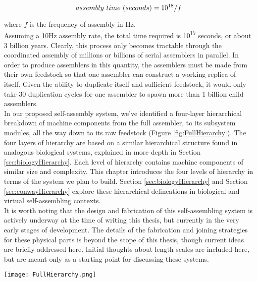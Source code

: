 {\[assembly\ time\ (seconds) = 10\textsuperscript{18}/f\]

where $f$ is the frequency of assembly in Hz.\\

Assuming a 10Hz assembly rate, the total time required is 10\textsuperscript{17} seconds, or about 3 billion years.  Clearly, this process only becomes tractable through the coordinated assembly of millions or billions of serial assemblers in parallel.  In order to produce assemblers in this quantity, the assemblers must be made from their own feedstock so that one assembler can construct a working replica of itself.  Given the ability to duplicate itself and sufficient feedstock, it would only take 30 duplication cycles for one assembler to spawn more than 1 billion child assemblers.\\

In our proposed self-assembly system, we've identified a four-layer hierarchical breakdown of machine components from the full assembler, to its subsystem modules, all the way down to its raw feedstock (Figure \ref{fig:FullHierarchy}).  The four layers of hierarchy are based on a similar hierarchical structure found in analogous biological systems, explained in more depth in Section \ref{sec:biologyHierarchy}.  Each level of hierarchy contains machine components of similar size and complexity.  This chapter introduces the four levels of hierarchy in terms of the system we plan to build.  Section \ref{sec:biologyHierarchy} and Section \ref{sec:conwayHierarchy} explore these hierarchical delineations in biological and virtual self-assembling contexts.\\ 

It is worth noting that the design and fabrication of this self-assembling system is actively underway at the time of writing this thesis, but currently in the very early stages of development.  The details of the fabrication and joining strategies for these physical parts is beyond the scope of this thesis, though current ideas are briefly addressed here.  Initial thoughts about length scales are included here, but are meant only as a starting point for discussing these systems.


\begin{sidewaysfigure}
 \texttt{[image: FullHierarchy.png]}
  \caption{Diagram of the hierarchical breakdown of robotic modules into functions and elements.  Examples of the geometric layout of elements to form functional primitives are indicated for a 1DOF bending flexure and a capacitor.  Images of fabricated functional parts are shown alongside their functional primitive decompositions.  More detailed views of the transition from elements to functional primitives and from functional primitives to functional parts are shown in Figures \ref{fig:Hierarchy-ElementsParts} and \ref{fig:Hierarchy-FunctionPrimitivesParts}.  \textit{Image Credit (for photos of fabricated functional parts): Will Langford 2016} }
  \label{fig:FullHierarchy}
\end{sidewaysfigure}

}
